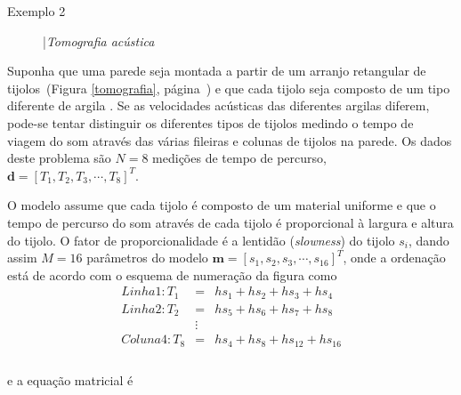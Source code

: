 \documentclass[a4paper, 12 pt]{article} %
\begin{document}
\begin{description}
	\item[Exemplo 2] |\textit{Tomografia acústica} 
\end{description}

Suponha que uma parede seja montada a partir de um arranjo retangular de tijolos~(Figura \ref{tomografia}, página~\pageref{tomografia}) e que cada tijolo seja composto de um tipo diferente de argila \citep{menke1984geophysical}. Se as velocidades acústicas das diferentes argilas diferem, pode-se tentar distinguir os diferentes tipos de tijolos medindo o tempo de viagem do som através das várias fileiras e colunas de tijolos na parede. Os dados deste problema são $N = 8$ medições de tempo de percurso, $\textbf{d} = [T_{1}, T_{2}, T_{3}, \cdots, T_{8}]^T$. 

O modelo assume que cada tijolo é composto de um material uniforme e que o tempo de percurso do som através de cada tijolo é proporcional à largura e altura do tijolo. O fator de proporcionalidade é a lentidão (\textit{slowness}) do tijolo $s_{i}$, dando assim $M = 16$ parâmetros do modelo $\textbf{m} = [s_{1}, s_{2}, s_{3}, \cdots, s_{16}]^T$, onde a ordenação está de acordo com o esquema de numeração da figura como \\


\begin{equation}\label{eq:formulation_tomografia}
\begin{matrix}
Linha 1: T_{1} &=& hs_{1} + hs_{2} + hs_{3} + hs_{4} \\
Linha 2: T_{2} &=& hs_{5} + hs_{6} + hs_{7} + hs_{8} \\
&\vdots \\
Coluna 4: T_{8} &=& hs_{4} + hs_{8} + hs_{12} + hs_{16} \\
\end{matrix}
\end{equation} \\
e a equação matricial é \\
\end{document}
